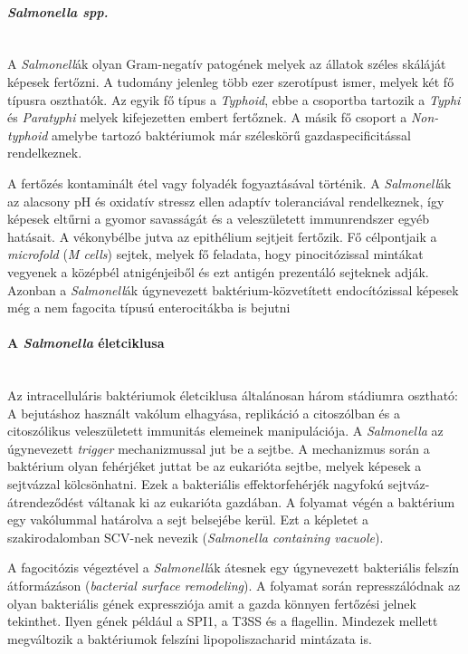 \documentclass[a4paper,12pt]{article}
\begin{document}
		\paragraph{\textit{Salmonella spp.}} \mbox{}\\
		A \textit{Salmonell}ák olyan Gram-negatív patogének melyek az állatok széles skáláját képesek fertőzni. A tudomány jelenleg több ezer szerotípust ismer, melyek két fő típusra oszthatók. Az egyik fő típus a \textit{Typhoid}, ebbe a csoportba tartozik a \textit{Typhi} és \textit{Paratyphi} melyek kifejezetten embert fertőznek. A másik fő csoport a \textit{Non-typhoid} amelybe tartozó baktériumok már széleskörű gazdaspecificitással rendelkeznek.
		
		A fertőzés kontaminált étel vagy folyadék fogyaztásával történik. A \textit{Salmonell}ák az alacsony pH és oxidatív stressz ellen adaptív toleranciával rendelkeznek, így képesek eltűrni a gyomor savasságát és a veleszületett immunrendszer egyéb hatásait. A vékonybélbe jutva az epithélium sejtjeit fertőzik. Fő célpontjaik a \textit{microfold} (\textit{M cells}) sejtek, melyek fő feladata, hogy pinocitózissal mintákat vegyenek a középbél atnigénjeiből és ezt antigén prezentáló sejteknek adják. Azonban a \textit{Salmonell}ák úgynevezett baktérium-közvetített endocítózissal képesek még a nem fagocita típusú enterocitákba is bejutni \cite{salmonella_and_host_cell_nature}
		
		
		\paragraph{A \textit{Salmonella} életciklusa} \mbox{}\\
		Az intracelluláris baktériumok életciklusa általánosan három stádiumra osztható: A bejutáshoz használt vakólum elhagyása, replikáció a citoszólban és a citoszólikus veleszületett immunitás elemeinek manipulációja. A \textit{Salmonella} az úgynevezett \textit{trigger} mechanizmussal jut be a sejtbe. A mechanizmus során a baktérium olyan fehérjéket juttat be az eukarióta sejtbe, melyek képesek a sejtvázzal kölcsönhatni. Ezek a bakteriális effektorfehérjék nagyfokú sejtváz-átrendeződést váltanak ki az eukarióta gazdában. A folyamat végén a baktérium egy vakólummal határolva a sejt belsejébe kerül. \cite{salmonella_autophagy_nature_old} Ezt a képletet a szakirodalomban SCV-nek nevezik (\textit{Salmonella containing vacuole}). \cite{salmonella_and_host_cell_nature}
		
		A fagocitózis végeztével a \textit{Salmonell}ák átesnek egy úgynevezett bakteriális felszín átformázáson (\textit{bacterial surface remodeling}). A folyamat során represszálódnak az olyan bakteriális gének expressziója amit a gazda könnyen fertőzési jelnek tekinthet. Ilyen gének például a SPI1, a T3SS és a flagellin. Mindezek mellett megváltozik a baktériumok felszíni lipopoliszacharid mintázata is.  \cite{salmonella_and_host_cell_nature}
		
\end{document}
